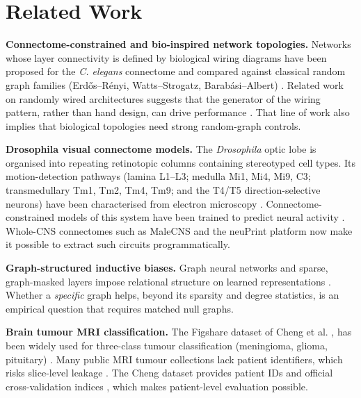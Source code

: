 \section{Related Work}
\label{sec:02_related_work}

\textbf{Connectome-constrained and bio-inspired network topologies.} Networks whose layer connectivity is defined by biological wiring diagrams have been proposed for the \emph{C. elegans} connectome and compared against classical random graph families (Erdős–Rényi, Watts–Strogatz, Barabási–Albert) \cite{ncnn} . Related work on randomly wired architectures suggests that the generator of the wiring pattern, rather than hand design, can drive performance . That line of work also implies that biological topologies need strong random-graph controls.

\textbf{Drosophila visual connectome models.} The \emph{Drosophila} optic lobe is organised into repeating retinotopic columns containing stereotyped cell types. Its motion-detection pathways (lamina L1–L3; medulla Mi1, Mi4, Mi9, C3; transmedullary Tm1, Tm2, Tm4, Tm9; and the T4/T5 direction-selective neurons) have been characterised from electron microscopy . Connectome-constrained models of this system have been trained to predict neural activity \cite{flyvis} . Whole-CNS connectomes such as MaleCNS \cite{malecns} and the neuPrint platform \cite{neuprint} now make it possible to extract such circuits programmatically.

\textbf{Graph-structured inductive biases.} Graph neural networks and sparse, graph-masked layers impose relational structure on learned representations . Whether a \emph{specific} graph helps, beyond its sparsity and degree statistics, is an empirical question that requires matched null graphs.

\textbf{Brain tumour MRI classification.} The Figshare dataset of Cheng et al. \cite{cheng2015enhanced}, \cite{cheng2024dataset} has been widely used for three-class tumour classification (meningioma, glioma, pituitary) \cite{cheng2016retrieval} . Many public MRI tumour collections lack patient identifiers, which risks slice-level leakage . The Cheng dataset provides patient IDs and official cross-validation indices \cite{cheng2024dataset}, which makes patient-level evaluation possible.
